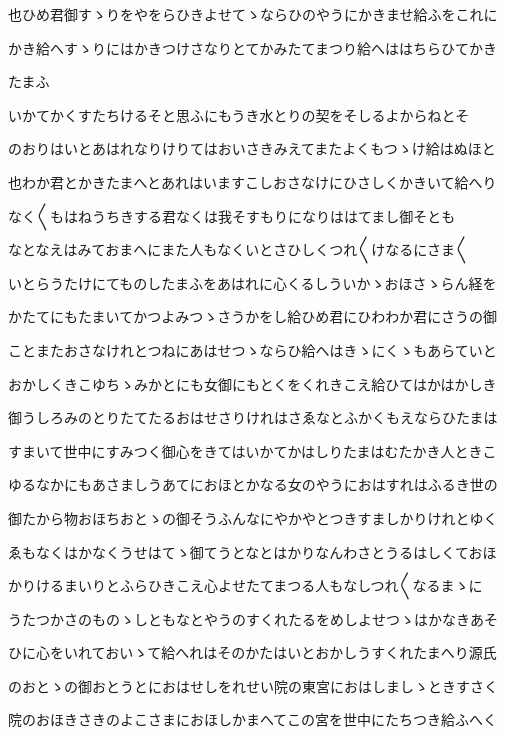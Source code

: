 \documentclass[a4paper,11pt,landscape]{ltjtarticle}
\begin{document}
也ひめ君御すゝりをやをらひきよせてゝならひのやうにかきませ給ふをこれに
\par\medskip
かき給へすゝりにはかきつけさなりとてかみたてまつり給へははちらひてかき
\par\medskip
たまふ
\par\medskip
いかてかくすたちけるそと思ふにもうき水とりの契をそしるよからねとそ
\par\medskip
のおりはいとあはれなりけりてはおいさきみえてまたよくもつゝけ給はぬほと
\par\medskip
也わか君とかきたまへとあれはいますこしおさなけにひさしくかきいて給へり
\par\medskip
なく〱もはねうちきする君なくは我そすもりになりははてまし御そとも
\par\medskip
なとなえはみておまへにまた人もなくいとさひしくつれ〱けなるにさま〱
\par\medskip
いとらうたけにてものしたまふをあはれに心くるしういかゝおほさゝらん経を
\par\medskip
かたてにもたまいてかつよみつゝさうかをし給ひめ君にひわわか君にさうの御
\par\medskip
ことまたおさなけれとつねにあはせつゝならひ給へはきゝにくゝもあらていと
\par\medskip
おかしくきこゆちゝみかとにも女御にもとくをくれきこえ給ひてはかはかしき
\par\medskip
御うしろみのとりたてたるおはせさりけれはさゑなとふかくもえならひたまは
\par\medskip
すまいて世中にすみつく御心をきてはいかてかはしりたまはむたかき人ときこ
\par\medskip
ゆるなかにもあさましうあてにおほとかなる女のやうにおはすれはふるき世の
\par\medskip
御たから物おほちおとゝの御そうふんなにやかやとつきすましかりけれとゆく
\par\medskip
ゑもなくはかなくうせはてゝ御てうとなとはかりなんわさとうるはしくておほ
\par\medskip
かりけるまいりとふらひきこえ心よせたてまつる人もなしつれ〱なるまゝに
\par\medskip
うたつかさのものゝしともなとやうのすくれたるをめしよせつゝはかなきあそ
\par\medskip
ひに心をいれておいゝて給へれはそのかたはいとおかしうすくれたまへり源氏
\par\medskip
のおとゝの御おとうとにおはせしをれせい院の東宮におはしましゝときすさく
\par\medskip
院のおほきさきのよこさまにおほしかまへてこの宮を世中にたちつき給ふへく
\par\medskip
\end{document}
